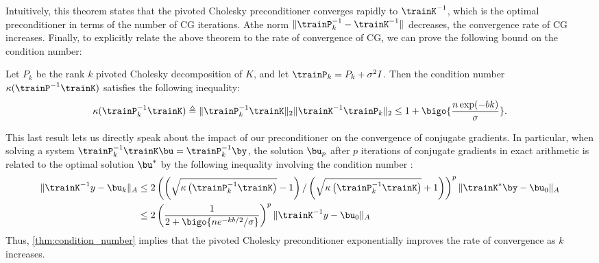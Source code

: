 %
Intuitively, this theorem states that the pivoted Cholesky preconditioner converges rapidly to $\trainK^{-1}$, which is the optimal preconditioner in terms of the number of CG iterations.
Athe norm $\Vert \trainP_{k}^{-1} - \trainK^{-1} \Vert$ decreases, the convergence rate of CG increases.
Finally, to explicitly relate the above theorem to the rate of convergence of CG, we can prove the following bound on the condition number:
%
\begin{theorem}
  \label{thm:condition_number}
  Let $P_{k}$ be the rank $k$ pivoted Cholesky decomposition of $K$, and let $\trainP_{k} = P_{k} + \sigma^{2}I$. Then the condition number $\kappa(\trainP^{-1}\trainK)$ satisfies the following inequality:
  \begin{equation}
    \kappa(\trainP_{k}^{-1}\trainK) \triangleq \Vert \trainP_{k}^{-1}\trainK \Vert_{2} \Vert \trainK^{-1}\trainP_{k} \Vert_{2} \leq 1 + \bigo{\frac{n\exp(-bk)}{\sigma}}.
  \end{equation}
\end{theorem}
%
This last result lets us directly speak about the impact of our preconditioner on the convergence of conjugate gradients.
In particular, when solving a system $\trainP_{k}^{-1}\trainK\bu = \trainP_{k}^{-1}\by$, the solution $\bu_{p}$ after $p$ iterations of conjugate gradients in exact arithmetic is related to the optimal solution $\bu^{*}$ by the following inequality involving the condition number :
%
\begin{equation}
  \begin{aligned}
  \Vert \trainK^{-1} y - \bu_{k} \Vert_{A}
  &\leq 2 \left( \left( {\sqrt{\kappa\left(\trainP_{k}^{-1}\trainK\right)} - 1} \right) / \left( {\sqrt{\kappa\left(\trainP_{k}^{-1}\trainK\right)} + 1} \right) \right)^{p}\Vert \trainK^{*}\by - \bu_{0} \Vert_{A}
  \\
  &\leq 2 \left(\frac{1}{2 + \bigo{n e^{-kb/2} / \sigma}}\right)^{p}\Vert \trainK^{-1} y - \bu_{0} \Vert_{A}
\end{aligned}
\end{equation}
%
Thus, \cref{thm:condition_number} implies that the pivoted Cholesky preconditioner exponentially improves the rate of convergence as $k$ increases.
